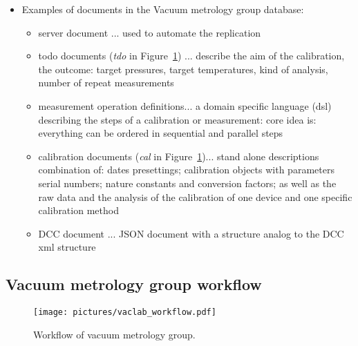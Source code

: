 \documentclass[3p,times,procedia]{elsarticle}
\begin{document}
\begin{itemize}
\item Examples of documents in the Vacuum metrology group database: 
  \begin{itemize}
  \item server document ... used to automate the replication 
  \item todo documents (\emph{tdo} in  Figure~\ref{fig:vl-work}) ...
    describe the aim of the calibration, the
    outcome: target pressures, target temperatures, kind of analysis,
    number of repeat measurements
  \item measurement operation definitions... a domain specific
    language (dsl) describing the steps of a calibration or measurement:
    core idea is: everything can be ordered in sequential and
    parallel steps
  \item calibration documents (\emph{cal} in  Figure~\ref{fig:vl-work})... 
    stand alone descriptions combination
    of: dates presettings; calibration objects with parameters serial
    numbers; nature constants and conversion factors; as well as
    the raw data and the analysis of the calibration of one device and
    one specific calibration method 
    \item DCC document ... JSON document with a structure analog to the DCC xml structure
  \end{itemize}
\end{itemize}

\subsection{Vacuum metrology group workflow}
\label{ssec:vl-work}

\begin{figure}
    \centering
    \texttt{[image: pictures/vaclab\_workflow.pdf]}
    \caption{Workflow of vacuum metrology group. }
    \label{fig:vl-work}
\end{figure}
\end{document}
